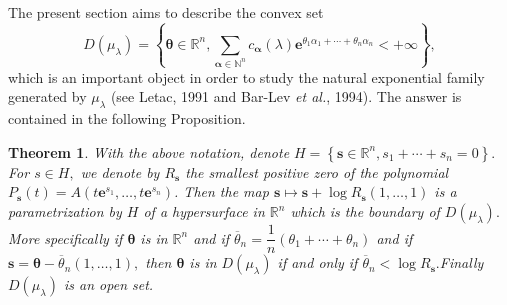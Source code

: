 \documentclass[a4paper,oneside,notitlepage]{article}%
\newtheorem{theorem}{Theorem}
\begin{document}
The present section aims to describe the convex set
\[
D\left(  \mu_{\lambda}\right)  =\left\{  \boldsymbol{\theta}\in\mathbb{R}^{n},%
{\displaystyle\sum\limits_{\mathbf{\boldsymbol{\alpha}}\in\mathbb{N}^{n}}}
c_{\mathbf{\boldsymbol{\alpha}}}\left(  \lambda\right)  \mathbf{e}^{\theta
_{1}\alpha_{1}+\cdots+\theta_{n}\alpha_{n}}<+\infty\right\}  ,
\]
which is an important object in order to study the natural exponential family
generated by $\mu_{\lambda}$ (see Letac, 1991 and Bar-Lev \textit{et al.},
1994). The answer is contained in the following Proposition.

\begin{theorem}
\label{mainTheorem}With the above notation, denote $H=\left\{  \mathbf{s}%
\in\mathbb{R}^{n},s_{1}+\cdots+s_{n}=0\right\}  .$ For \textbf{$s$}$\in H,$ we
denote by $R_{\mathbf{s}}$ the smallest positive zero of the polynomial
$P_{\mathbf{s}}\left(  t\right)  =A\left(  t\mathbf{e}^{s_{1}},\ldots
,t\mathbf{e}^{s_{n}}\right)  $. Then the map $\mathbf{s}\mapsto\mathbf{s}+\log
R_{\mathbf{s}}\left(  1,\ldots,1\right)  $ is a parametrization by $H$ of a
hypersurface in $\mathbb{R}^{n}$ which is the boundary of $D\left(
\mu_{\lambda}\right)  .$ More specifically if $\boldsymbol{\theta}$ is in
$\mathbb{R}^{n}$ and if $\overline{\theta}_{n}=\dfrac{1}{n}\left(  \theta
_{1}+\cdots+\theta_{n}\right)  $ and if $\mathbf{s}=\boldsymbol{\theta
}-\overline{\theta}_{n}\left(  1,\ldots,1\right)  ,$ then $\boldsymbol{\theta
}$ is in $D\left(  \mu_{\lambda}\right)  $ if and only if $\overline{\theta
}_{n}<\log R_{\mathbf{s}}.$\newline Finally $D\left(  \mu_{\lambda}\right)  $
is an open set.
\end{theorem}
\end{document}
